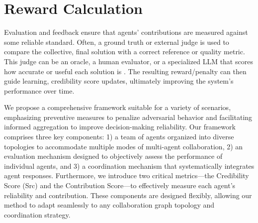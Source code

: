\section{Reward Calculation}\label{app:reward}

Evaluation and feedback ensure that agents’ contributions are measured against some reliable standard. Often, a ground truth or external judge is used to compare the collective, final solution with a correct reference or quality metric. This judge can be an oracle, a human evaluator, or a specialized LLM that scores how accurate or useful each solution is \cite{researchQA}. The resulting reward/penalty can then guide learning, credibility score updates, ultimately improving the system’s performance over time. 

We propose a comprehensive framework suitable for a variety of scenarios, emphasizing preventive measures to penalize adversarial behavior and facilitating informed aggregation to improve decision-making reliability. Our framework comprises three key components: 1) a team of agents organized into diverse topologies to accommodate multiple modes of multi-agent collaboration, 2) an evaluation mechanism designed to objectively assess the performance of individual agents, and 3) a coordination mechanism that systematically integrates agent responses. Furthermore, we introduce two critical metrics—the Credibility Score (Src) and the Contribution Score—to effectively measure each agent's reliability and contribution. These components are designed flexibly, allowing our method to adapt seamlessly to any collaboration graph topology and coordination strategy.